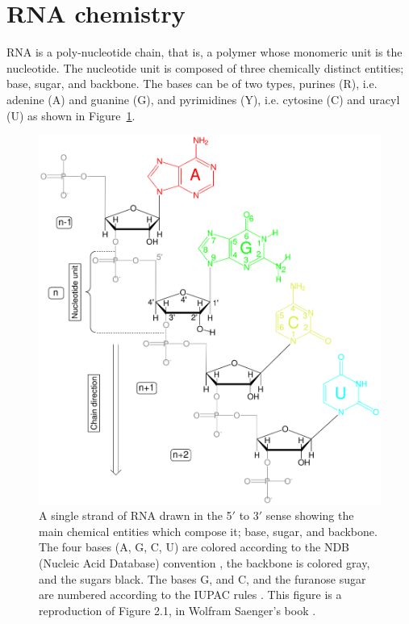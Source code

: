 \section{RNA chemistry}
RNA is  a poly-nucleotide  chain, that is,  a polymer  whose monomeric
unit  is the  nucleotide.  The  nucleotide unit  is composed  of three
chemically distinct entities; base, sugar, and backbone. The bases can
be of two  types, purines (R), i.e. adenine (A) and  guanine (G), and
pyrimidines (Y),
i.e. cytosine (C) and uracyl (U) as shown in Figure~\ref{fig:chemistry1}.
\begin{figure}
\centering
\includegraphics[scale=3.0]{Chapter1/chemistry1b.png}
\caption{A  single strand  of  RNA drawn  in  the 5$'$  to 3$'$  sense
  showing the  main chemical entities  which compose it;  base, sugar,
  and backbone.  The four bases (A,  G, C, U) are colored according to
  the  NDB  (Nucleic  Acid  Database)  convention  \cite{ndburl},  the
  backbone is colored gray, and the  sugars black. The bases G, and C,
  and the  furanose sugar  are numbered according  to the  IUPAC rules
  \cite{iupac1983}. This  figure is a  reproduction of Figure  2.1, in
  Wolfram Saenger's book \cite{saenger1984}.}
\label{fig:chemistry1}
\end{figure}  


